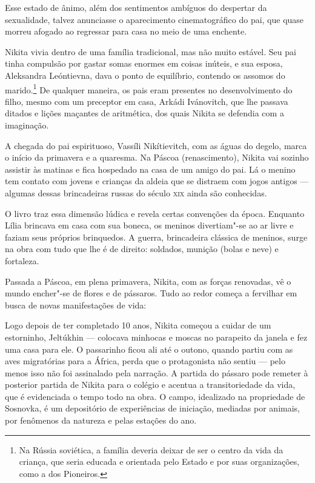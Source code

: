 Esse estado de ânimo, além dos sentimentos ambíguos do despertar da
sexualidade, talvez anunciasse o aparecimento cinematográfico do pai,
que quase morreu afogado ao regressar para casa no meio de uma enchente.

Nikita vivia dentro de uma família tradicional, mas não muito estável.
Seu pai tinha compulsão por gastar somas enormes em coisas inúteis, e
sua esposa, Aleksandra Leóntievna, dava o ponto de equilíbrio, contendo
os assomos do marido.\footnote{Na Rússia soviética, a família deveria
  deixar de ser o centro da vida da criança, que seria educada e
  orientada pelo Estado e por suas organizações, como a dos Pioneiros.}
De qualquer maneira, os pais eram presentes no desenvolvimento do filho,
mesmo com um preceptor em casa, Arkádi Ivánovitch, que lhe passava
ditados e lições maçantes de aritmética, dos quais Nikita se defendia
com a imaginação.

A chegada do pai espirituoso, Vassíli Nikítievitch, com as águas do
degelo, marca o início da primavera e a quaresma. Na Páscoa
(renascimento), Nikita vai sozinho assistir às matinas e fica hospedado
na casa de um amigo do pai. Lá o menino tem contato com jovens e
crianças da aldeia que se distraem com jogos antigos --- algumas dessas
brincadeiras russas do século \textsc{xix} ainda são conhecidas.

O livro traz essa dimensão lúdica e revela certas convenções da época.
Enquanto Lília brincava em casa com sua boneca, os meninos divertiam"-se
ao ar livre e faziam seus próprios brinquedos. A guerra, brincadeira
clássica de meninos, surge na obra com tudo que lhe é de direito: soldados, munição
(bolas e neve) e fortaleza.

Passada a Páscoa, em plena primavera, Nikita, com as forças renovadas,
vê o mundo encher"-se de flores e de pássaros. Tudo ao redor começa a
fervilhar em busca de novas manifestações de vida:

\begin{quote}
\end{quote}

Logo depois de ter completado 10 anos, Nikita começou a cuidar de um
estorninho, Jeltúkhin --- colocava minhocas e moscas no parapeito da
janela e fez uma casa para ele. O passarinho ficou ali até o outono,
quando partiu com as aves migratórias para a África, perda que o
protagonista não sentiu --- pelo menos isso não foi assinalado pela
narração. A partida do pássaro pode remeter à posterior partida de
Nikita para o colégio e acentua a transitoriedade da vida, que é
evidenciada o tempo todo na obra. O campo, idealizado na propriedade de Sosnovka,
é um depositório de experiências de iniciação, mediadas por animais, por
fenômenos da natureza e pelas estações do ano.

